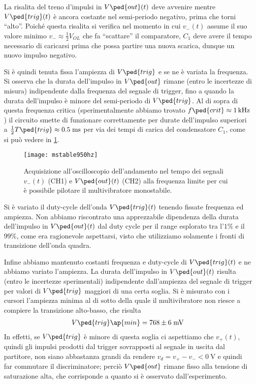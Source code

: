 \documentclass[10pt, a4paper, italian]{article}
\begin{document}
La risalita del treno d'impulsi in $V\ped{out} (t)$ deve avvenire mentre
$V\ped{trig} (t)$ è ancora costante nel semi-periodo negativo, prima che torni
``alto''. Poiché questa risalita si verifica nel momento in cui $v_- (t)$
assume il suo valore minimo $v_- \approx \frac{1}{2} V_{OL}$ che fa
``scattare'' il comparatore, $C_1$ deve avere il tempo necessario di caricarsi
prima che possa partire una nuova scarica, dunque un nuovo impulso negativo.

Si è quindi tenuta fissa l'ampiezza di $V\ped{trig}$ e se ne è variata la
frequenza. Si osserva che la durata dell'impulso in $V\ped{out}$ rimane
(entro le incertezze di misura) indipendente dalla frequenza del segnale di
trigger, fino a quando la durata dell'impulso è minore del semi-periodo di
$V\ped{trig}$. Al di sopra di questa frequenza critica (sperimentalmente
abbiamo trovato $f\ped{crit} \approx \SI{1}{k\hertz}$) il circuito smette di
funzionare correttamente per durate dell'impulso superiori a
$\frac{1}{2} T\ped{trig} \approx 0.5 \; \si{m\s}$ per via dei tempi di carica
del condensatore $C_1$, come si può vedere in \cref{fig: mstabileflim}.
\begin{figure}[htbp]
	\centering
	\texttt{[image: mstable950hz]}
	\caption{Acquisizione all'oscilloscopio dell'andamento nel tempo dei
	segnali $v_- (t)$ (CH1) e $V\ped{out} (t)$ (CH2) alla frequenza limite
	per cui è possibile pilotare il multivibratore monostabile.
	\label{fig: mstabileflim}}
\end{figure}

Si è variato il duty-cycle dell'onda $V\ped{trig} (t)$ tenendo fissate
frequenza ed ampiezza. Non abbiamo riscontrato una apprezzabile dipendenza
della durata dell'impulso in $V\ped{out} (t)$ dal duty cycle per il range
esplorato tra l'$1 \%$ e il $99 \%$, come era ragionevole aspettarsi, visto che
utilizziamo solamente i fronti di transizione dell'onda quadra.

Infine abbiamo mantenuto costanti frequenza e duty-cycle di $V\ped{trig} (t)$
e ne abbiamo variato l'ampiezza. La durata dell'impulso in $V\ped{out} (t)$
risulta (entro le incertezze sperimentali) indipendente dall'ampiezza del
segnale di trigger per valori di $V\ped{trig}$ maggiori di una certa soglia.
Si è misurato con i cursori l'ampiezza minima al di sotto della quale
il multivibratore non riesce a compiere la transizione alto-basso,
che risulta
\begin{align*}
V\ped{trig}\ap{min} = 768 \pm 6 \; \si{m\V}
\end{align*}
In effetti, se $V\ped{trig}$ è minore di questa soglia ci aspettiamo
che $v_+ (t)$, quindi gli impulsi prodotti dal trigger sovrapposti al segnale
in uscita dal partitore, non siano abbastanza grandi da rendere
$v_d = v_+ - v_- < \SI{0}{\V}$ e quindi far commutare il discriminatore; perciò
$V\ped{out}$ rimane fisso alla tensione di saturazione alta, che
corrisponde a quanto si è osservato dall'esperimento.
\end{document}
